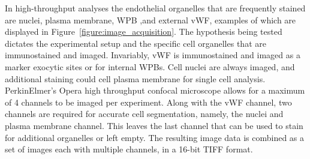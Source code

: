 In high-throughput analyses the endothelial organelles that are frequently stained are nuclei, plasma membrane, WPB ,and external vWF, examples of which are displayed in Figure~\ref{figure:image_acquisition}. The hypothesis being tested dictates the experimental setup and the specific cell organelles that are immunostained and imaged. Invariably, vWF is immunostained and imaged as a marker exocytic sites or for internal WPBs. Cell nuclei are always imaged, and additional staining could cell plasma membrane for single cell analysis. PerkinElmer's Opera high throughput confocal microscope allows for a maximum of 4 channels to be imaged per experiment. Along with the vWF channel, two channels are required for accurate cell segmentation, namely, the nuclei and plasma membrane channel. This leaves the last channel that can be used to stain for additional organelles or left empty. The resulting image data is combined as a set of images each with multiple channels, in a 16-bit TIFF format.

